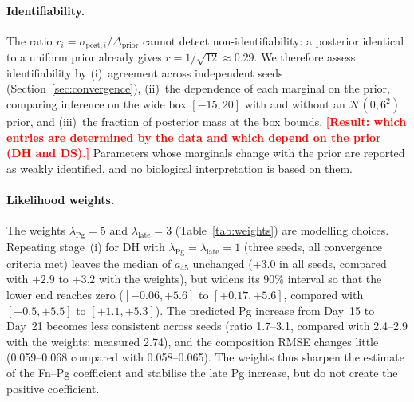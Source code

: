 \documentclass[pdflatex,sn-mathphys-ay,lineno]{sn-jnl}%
\newcommand{\TBD}[1]{\textcolor{red}{\textbf{[#1]}}}
\begin{document}
\paragraph{Identifiability.}
The ratio $r_i=\sigma_{\mathrm{post},i}/\Delta_{\mathrm{prior}}$ cannot detect non-identifiability: a posterior identical to a uniform prior already gives $r=1/\sqrt{12}\approx0.29$.
We therefore assess identifiability by (i)~agreement across independent seeds (Section~\ref{sec:convergence}), (ii)~the dependence of each marginal on the prior, comparing inference on the wide box $[-15,20]$ with and without an $\mathcal{N}(0,6^2)$ prior, and (iii)~the fraction of posterior mass at the box bounds.
\TBD{Result: which entries are determined by the data and which depend on the prior (DH and DS).}
Parameters whose marginals change with the prior are reported as weakly identified, and no biological interpretation is based on them.

\paragraph{Likelihood weights.}
The weights $\lambda_{\mathrm{Pg}}=5$ and $\lambda_{\mathrm{late}}=3$ (Table~\ref{tab:weights}) are modelling choices.
Repeating stage~(i) for DH with $\lambda_{\mathrm{Pg}}=\lambda_{\mathrm{late}}=1$ (three seeds, all convergence criteria met) leaves the median of $a_{45}$ unchanged ($+3.0$ in all seeds, compared with $+2.9$ to $+3.2$ with the weights), but widens its 90\% interval so that the lower end reaches zero ($[-0.06,+5.6]$ to $[+0.17,+5.6]$, compared with $[+0.5,+5.5]$ to $[+1.1,+5.3]$).
The predicted Pg increase from Day~15 to Day~21 becomes less consistent across seeds (ratio 1.7--3.1, compared with 2.4--2.9 with the weights; measured 2.74), and the composition RMSE changes little (0.059--0.068 compared with 0.058--0.065).
The weights thus sharpen the estimate of the Fn--Pg coefficient and stabilise the late Pg increase, but do not create the positive coefficient.
\end{document}
